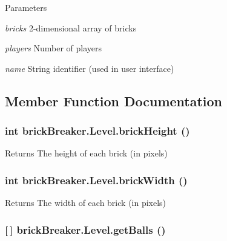 \begin{DoxyParams}{Parameters}
\item[{\em bricks}]2-\/dimensional array of bricks \item[{\em players}]Number of players \item[{\em name}]String identifier (used in user interface) \end{DoxyParams}


\subsection{Member Function Documentation}
\hypertarget{classbrick_breaker_1_1_level_adf924d8f95efb086b49b5709c6b5e48e}{
\subsubsection[{brickHeight}]{\setlength{\rightskip}{0pt plus 5cm}int brickBreaker.Level.brickHeight ()}}
\label{classbrick_breaker_1_1_level_adf924d8f95efb086b49b5709c6b5e48e}
\begin{DoxyReturn}{Returns}
The height of each brick (in pixels) 
\end{DoxyReturn}
\hypertarget{classbrick_breaker_1_1_level_a21baab3427644fa78d1b7e98757b3609}{
\subsubsection[{brickWidth}]{\setlength{\rightskip}{0pt plus 5cm}int brickBreaker.Level.brickWidth ()}}
\label{classbrick_breaker_1_1_level_a21baab3427644fa78d1b7e98757b3609}
\begin{DoxyReturn}{Returns}
The width of each brick (in pixels) 
\end{DoxyReturn}
\hypertarget{classbrick_breaker_1_1_level_aabd74f57cf3043d6bae8b98953344e4b}{
\subsubsection[{getBalls}]{ \mbox{[}$\,$\mbox{]} brickBreaker.Level.getBalls ()}}
